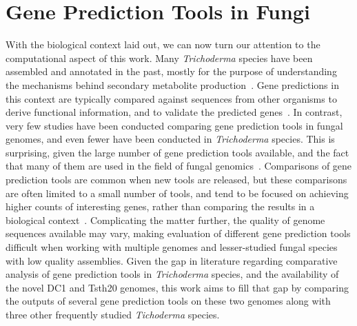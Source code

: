 
\section{Gene Prediction Tools in Fungi}
\label{lit:comp-motiv}
With the biological context laid out, we can now turn our attention to the computational aspect of this work. Many \textit{Trichoderma} species have been assembled and annotated in the past, mostly for the purpose of understanding the mechanisms behind secondary metabolite production~\cite{Mukherjee2012}. Gene predictions in this context are typically compared against sequences from other organisms to derive functional information, and to validate the predicted genes~\cite{loftus2003a}. In contrast, very few studies have been conducted comparing gene prediction tools in fungal genomes, and even fewer have been conducted in \textit{Trichoderma} species. This is surprising, given the large number of gene prediction tools available, and the fact that many of them are used in the field of fungal genomics~\cite{ejigu2020a}. Comparisons of gene prediction tools are common when new tools are released, but these comparisons are often limited to a small number of tools, and tend to be focused on achieving higher counts of interesting genes, rather than comparing the results in a biological context~\cite{min2017}. Complicating the matter further, the quality of genome sequences available may vary, making evaluation of different gene prediction tools difficult when working with multiple genomes and lesser-studied fungal species with low quality assemblies. Given the gap in literature regarding comparative analysis of gene prediction tools in \textit{Trichoderma} species, and the availability of the novel DC1 and Tsth20 genomes, this work aims to fill that gap by comparing the outputs of several gene prediction tools on these two genomes along with three other frequently studied \textit{Tichoderma} species.

